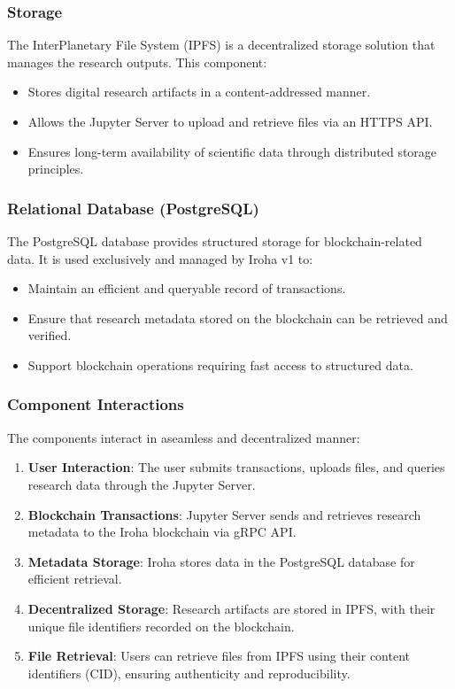 \documentclass{article}
\begin{document}
\subsubsection{Storage}
The InterPlanetary File System (IPFS) is a decentralized storage solution that manages the research outputs. This component:
\begin{itemize}
      \item Stores digital research artifacts in a content-addressed manner.
      \item Allows the Jupyter Server to upload and retrieve files via an HTTPS API.
      \item Ensures long-term availability of scientific data through distributed storage principles.
\end{itemize}


\subsubsection{Relational Database (PostgreSQL)}
The PostgreSQL database provides structured storage for blockchain-related data. It is used exclusively and managed by Iroha v1 to:
\begin{itemize}
      \item Maintain an efficient and queryable record of transactions.
      \item Ensure that research metadata stored on the blockchain can be retrieved and verified.
      \item Support blockchain operations requiring fast access to structured data.
\end{itemize}

\subsubsection{Component Interactions}
The components interact in aseamless and decentralized manner:
\begin{enumerate}
      \item \textbf{User Interaction}: The user submits transactions, uploads files, and queries research data through the Jupyter Server.
      \item \textbf{Blockchain Transactions}: Jupyter Server sends and retrieves research metadata to the Iroha blockchain via gRPC API.
      \item \textbf{Metadata Storage}: Iroha stores data in the PostgreSQL database for efficient retrieval.
      \item \textbf{Decentralized Storage}: Research artifacts are stored in IPFS, with their unique file identifiers recorded on the blockchain.
      \item \textbf{File Retrieval}: Users can retrieve files from IPFS using their content identifiers (CID), ensuring authenticity and reproducibility.
\end{enumerate}
\end{document}
